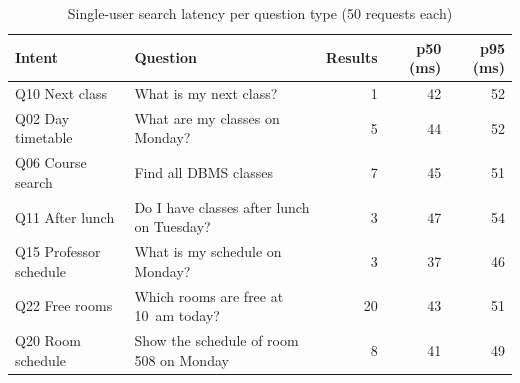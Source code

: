 \begin{table}[H]
\centering
\caption{Single-user search latency per question type (50 requests each)}
\label{tab:latency}
\small
\setlength{\tabcolsep}{4pt}\begin{tabular}{@{}llrrr@{}}
\toprule
\textbf{Intent} & \textbf{Question} & \textbf{Results} & \textbf{p50 (ms)} & \textbf{p95 (ms)}\\
\midrule
Q10 Next class & What is my next class? & 1 & 42 & 52\\
Q02 Day timetable & What are my classes on Monday? & 5 & 44 & 52\\
Q06 Course search & Find all DBMS classes & 7 & 45 & 51\\
Q11 After lunch & Do I have classes after lunch on Tuesday? & 3 & 47 & 54\\
Q15 Professor schedule & What is my schedule on Monday? & 3 & 37 & 46\\
Q22 Free rooms & Which rooms are free at 10~am today? & 20 & 43 & 51\\
Q20 Room schedule & Show the schedule of room 508 on Monday & 8 & 41 & 49\\
\bottomrule
\end{tabular}
\end{table}
